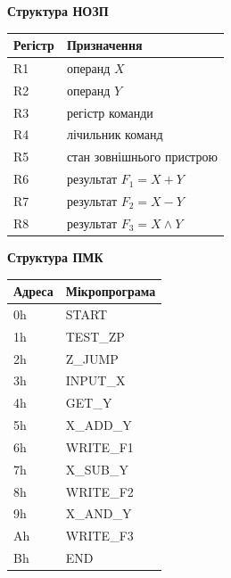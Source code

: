 \documentclass[12pt,a4paper]{article}
\begin{document}
\begin{center}
\begin{minipage}[t]{0.47\textwidth}
\centering
\textbf{Структура НОЗП}

\vspace{0.4em}
\small
\begin{tabular}{|C{1.8cm}|p{4.5cm}|}
    \hline
    \textbf{Регістр} & \textbf{Призначення} \\ \hline
    R1 & операнд $X$ \\ \hline
    R2 & операнд $Y$ \\ \hline
    R3 & регістр команди \\ \hline
    R4 & лічильник команд \\ \hline
    R5 & стан зовнішнього пристрою \\ \hline
    R6 & результат $F_1 = X + Y$ \\ \hline
    R7 & результат $F_2 = X - Y$ \\ \hline
    R8 & результат $F_3 = X \wedge Y$ \\ \hline
\end{tabular}
\end{minipage}
\hfill
\begin{minipage}[t]{0.47\textwidth}
\centering
\textbf{Структура ПМК}

\vspace{0.4em}
\small
\begin{tabular}{|C{1.5cm}|p{4.7cm}|}
    \hline
    \textbf{Адреса} & \textbf{Мікропрограма} \\ \hline
    0h & START \\ \hline
    1h & TEST\_ZP \\ \hline
    2h & Z\_JUMP \\ \hline
    3h & INPUT\_X \\ \hline
    4h & GET\_Y \\ \hline
    5h & X\_ADD\_Y \\ \hline
    6h & WRITE\_F1 \\ \hline
    7h & X\_SUB\_Y \\ \hline
    8h & WRITE\_F2 \\ \hline
    9h & X\_AND\_Y \\ \hline
    Ah & WRITE\_F3 \\ \hline
    Bh & END \\ \hline
\end{tabular}
\end{minipage}
\end{center}
\end{document}
